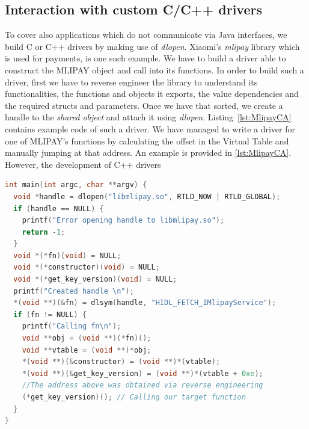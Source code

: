 \documentclass[a4paper,11pt,oneside]{article}
\begin{document}
\subsection{Interaction with custom C/C++ drivers}
\label{sub:CDriver}
To cover also applications which do not communicate via Java interfaces, we build C or C++ drivers by making use of \emph{dlopen}.
Xiaomi's \emph{mlipay} library
which is used for payments, is one such example. We have to build a driver able to construct the MLIPAY object and call into its functions. In order to
build such a driver, first we have to reverse engineer the library to
understand its functionalities, the functions and objects it exports, the value dependencies and the required structs and parameters. Once we have that sorted, we create a handle to the \emph{shared object} and
attach it using \emph{dlopen}. Listing~\ref{lst:MlipayCA} contains example code of such a driver.
We have managed to write a driver for one of MLIPAY's functions by calculating the offset in the Virtual Table and manually jumping at that address. An example is provided in \autoref{lst:MlipayCA}. 
However, the development of C++ drivers
\begin{lstlisting}[language=C++, label={lst:MlipayCA}, caption= Example driver for mlipay]
int main(int argc, char **argv) {
  void *handle = dlopen("libmlipay.so", RTLD_NOW | RTLD_GLOBAL);
  if (handle == NULL) {
    printf("Error opening handle to libmlipay.so");
    return -1;
  }
  void *(*fn)(void) = NULL;
  void *(*constructor)(void) = NULL;
  void *(*get_key_version)(void) = NULL;
  printf("Created handle \n");
  *(void **)(&fn) = dlsym(handle, "HIDL_FETCH_IMlipayService");
  if (fn != NULL) {
    printf("Calling fn\n");
    void **obj = (void **)(*fn)();
    void **vtable = (void **)*obj;
    *(void **)(&constructor) = (void **)*(vtable);
    *(void **)(&get_key_version) = (void **)*(vtable + 0xe);
    //The address above was obtained via reverse engineering
    (*get_key_version)(); // Calling our target function
  }
}
\end{lstlisting}


\end{document}
